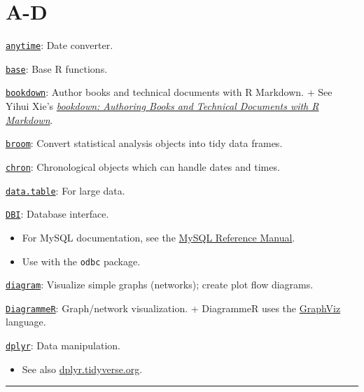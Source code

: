\documentclass[]{book}
\providecommand{\tightlist}{%
  \setlength{\itemsep}{0pt}\setlength{\parskip}{0pt}}
\theoremstyle{definition}
\theoremstyle{definition}
\theoremstyle{definition}
\theoremstyle{remark}
\begin{document}
\section{A-D}\label{a-d}

\href{https://CRAN.R-project.org/package=anytime}{\texttt{anytime}}:
Date converter.

\href{https://www.rdocumentation.org/packages/base/versions/3.5.1}{\texttt{base}}:
Base R functions.

\href{https://CRAN.R-project.org/package=bookdown}{\texttt{bookdown}}:
Author books and technical documents with R Markdown. + See Yihui Xie's
\href{https://bookdown.org/yihui/bookdown/}{\emph{bookdown: Authoring
Books and Technical Documents with R Markdown}}.

\href{https://CRAN.R-project.org/package=broom}{\texttt{broom}}: Convert
statistical analysis objects into tidy data frames.

\href{https://CRAN.R-project.org/package=chron}{\texttt{chron}}:
Chronological objects which can handle dates and times.

\href{https://CRAN.R-project.org/package=data.table}{\texttt{data.table}}:
For large data.

\href{https://CRAN.R-project.org/package=DBI}{\texttt{DBI}}: Database
interface.

\begin{itemize}
\item
  For MySQL documentation, see the \href{https://dev.mysql.com/}{MySQL
  Reference Manual}.
\item
  Use with the \texttt{odbc} package.
\end{itemize}

\href{https://CRAN.R-project.org/package=diagram}{\texttt{diagram}}:
Visualize simple graphs (networks); create plot flow diagrams.

\href{https://CRAN.R-project.org/package=DiagrammeR}{\texttt{DiagrammeR}}:
Graph/network visualization. + DiagrammeR uses the
\href{https://www.graphviz.org/}{GraphViz} language.

\href{https://CRAN.R-project.org/package=dplyr}{\texttt{dplyr}}: Data
manipulation.

\begin{itemize}
\tightlist
\item
  See also \href{https://dplyr.tidyverse.org/}{dplyr.tidyverse.org}.
\end{itemize}

\begin{center}\rule{0.5\linewidth}{\linethickness}\end{center}
\end{document}
